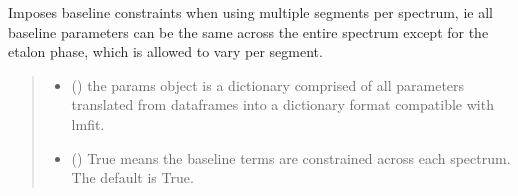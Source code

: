 \documentclass[letterpaper,10pt,english]{sphinxmanual}
\begin{document}
\begin{fulllineitems}
\begin{fulllineitems}
\begin{quote}
\begin{description}
\end{description}\end{quote}

\end{fulllineitems}


\begin{fulllineitems}
\label{\detokenize{MATS:MATS.fit_dataset.Fit_DataSet.constrained_baseline}}
\pysigstartsignatures
{}
\pysigstopsignatures
\sphinxAtStartPar
Imposes baseline constraints when using multiple segments per spectrum, ie all baseline parameters can be the same across the entire spectrum except for the etalon phase, which is allowed to vary per segment.
\begin{quote}\begin{description}
\begin{itemize}
\item {} 
\sphinxAtStartPar
{} () \textendash{} the params object is a dictionary comprised of all parameters translated from dataframes into a dictionary format compatible with lmfit.

\item {} 
\sphinxAtStartPar
{} (\sphinxstyleliteralemphasis{\sphinxupquote{, }}) \textendash{} True means the baseline terms are constrained across each spectrum. The default is True.


\end{itemize}
\end{description}
\end{quote}
\end{fulllineitems}
\end{fulllineitems}
\end{document}
